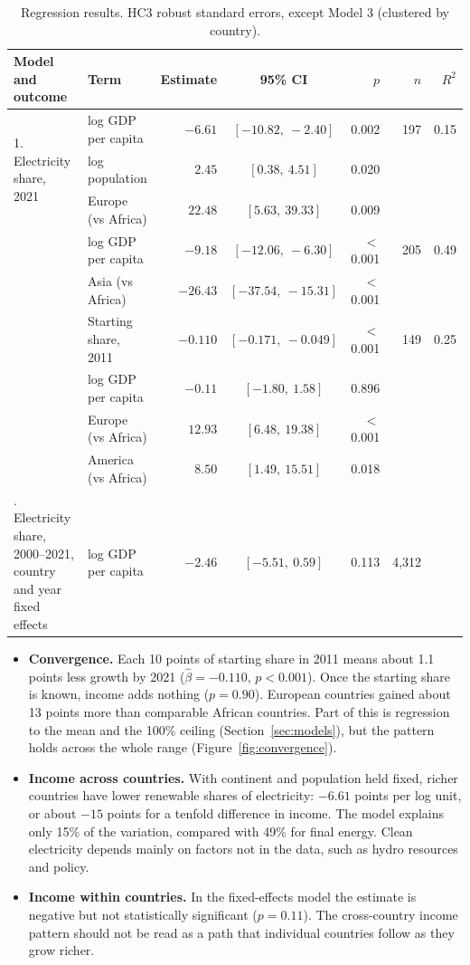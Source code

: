 \documentclass[11pt,a4paper]{article}
\begin{document}
\begin{table}[H]
\centering\small
\caption{Regression results. HC3 robust standard errors, except Model 3 (clustered by country).}\label{tab:models}
\begin{tabularx}{\textwidth}{@{}Xlrcrrr@{}}
\toprule
\textbf{Model and outcome} & \textbf{Term} & \textbf{Estimate} & \textbf{95\% CI} & \textbf{$p$} & \textbf{$n$} & \textbf{$R^2$} \\
\midrule
\multirow{3}{=}{1. Electricity share, 2021} & log GDP per capita & $-6.61$ & $[-10.82,\ -2.40]$ & 0.002 & 197 & 0.15 \\
 & log population & $2.45$ & $[0.38,\ 4.51]$ & 0.020 & & \\
 & Europe (vs Africa) & $22.48$ & $[5.63,\ 39.33]$ & 0.009 & & \\
\addlinespace
\multirow{2}{=}{1. Final-energy share, 2021} & log GDP per capita & $-9.18$ & $[-12.06,\ -6.30]$ & $<$0.001 & 205 & 0.49 \\
 & Asia (vs Africa) & $-26.43$ & $[-37.54,\ -15.31]$ & $<$0.001 & & \\
\addlinespace
\multirow{4}{=}{2. Change in electricity share, 2011--2021} & Starting share, 2011 & $-0.110$ & $[-0.171,\ -0.049]$ & $<$0.001 & 149 & 0.25 \\
 & log GDP per capita & $-0.11$ & $[-1.80,\ 1.58]$ & 0.896 & & \\
 & Europe (vs Africa) & $12.93$ & $[6.48,\ 19.38]$ & $<$0.001 & & \\
 & America (vs Africa) & $8.50$ & $[1.49,\ 15.51]$ & 0.018 & & \\
\addlinespace
3. Electricity share, 2000--2021, country and year fixed effects & log GDP per capita & $-2.46$ & $[-5.51,\ 0.59]$ & 0.113 & 4,312 & \\
\bottomrule
\end{tabularx}
\end{table}

\begin{itemize}
  \item \textbf{Convergence.} Each 10 points of starting share in 2011 means about 1.1 points less growth by 2021 ($\hat\beta = -0.110$, $p<0.001$). Once the starting share is known, income adds nothing ($p = 0.90$). European countries gained about 13 points more than comparable African countries. Part of this is regression to the mean and the 100\% ceiling (Section~\ref{sec:models}), but the pattern holds across the whole range (Figure~\ref{fig:convergence}).
  \item \textbf{Income across countries.} With continent and population held fixed, richer countries have lower renewable shares of electricity: $-6.61$ points per log unit, or about $-15$ points for a tenfold difference in income. The model explains only 15\% of the variation, compared with 49\% for final energy. Clean electricity depends mainly on factors not in the data, such as hydro resources and policy.
  \item \textbf{Income within countries.} In the fixed-effects model the estimate is negative but not statistically significant ($p = 0.11$). The cross-country income pattern should not be read as a path that individual countries follow as they grow richer.
\end{itemize}
\end{document}
